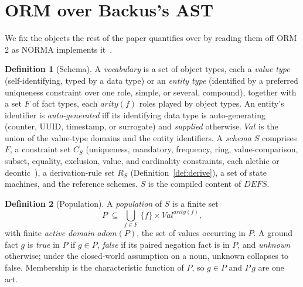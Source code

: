 \documentclass[10pt,twocolumn]{article}
\theoremstyle{plain}
\theoremstyle{definition}
\newtheorem{definition}{Definition}
\begin{document}
\section{ORM over Backus's AST}\label{sec:mapping}

We fix the objects the rest of the paper quantifies over by reading them off ORM 2 as NORMA implements it~\cite{halpin08,norma}.

\begin{definition}[Schema]\label{def:schema}
A \emph{vocabulary} is a set of object types, each a \emph{value type} (self-identifying, typed by a data type) or an \emph{entity type} (identified by a preferred uniqueness constraint over one role, simple, or several, compound), together with a set $F$ of fact types, each $\mathit{arity}(f)$ roles played by object types. An entity's identifier is \emph{auto-generated} iff its identifying data type is auto-generating (counter, UUID, timestamp, or surrogate) and \emph{supplied} otherwise. $\mathit{Val}$ is the union of the value-type domains and the entity identifiers. A \emph{schema} $S$ comprises $F$, a constraint set $C_S$ (uniqueness, mandatory, frequency, ring, value-comparison, subset, equality, exclusion, value, and cardinality constraints, each alethic or deontic~\cite{norma}), a derivation-rule set $R_S$ (Definition~\ref{def:derive}), a set of state machines, and the reference schemes. $S$ is the compiled content of $\mathit{DEFS}$.
\end{definition}

\begin{definition}[Population]\label{def:pop}
A \emph{population} of $S$ is a finite set
\[
P \;\subseteq\; \textstyle\bigcup_{f\in F}\,\{f\}\times\mathit{Val}^{\mathit{arity}(f)},
\]
with finite \emph{active domain} $\mathit{adom}(P)$, the set of values occurring in $P$. A ground fact $g$ is \emph{true} in $P$ if $g\in P$, \emph{false} if its paired negation fact is in $P$, and \emph{unknown} otherwise; under the closed-world assumption on a noun, unknown collapses to false. Membership is the characteristic function of $P$, so $g\in P$ and $P\,g$ are one act.
\end{definition}
\end{document}
